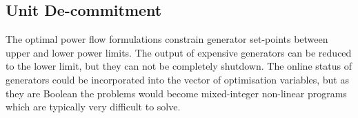 %

\subsection{Unit De-commitment}
\label{sec:decommit}
The optimal power flow formulations constrain generator set-points between
upper and lower power limits.  The output of expensive generators can be
reduced to the lower limit, but they can not be completely shutdown.  The
online status of generators could be incorporated into the vector of
optimisation variables, but as they are Boolean the problems would become
mixed-integer non-linear programs which are typically very difficult to
solve.

